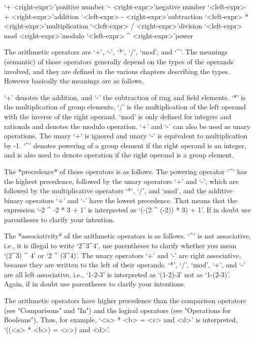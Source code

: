 

\>`+ <right-expr>'{positive number}
\>`- <right-expr>'{negative number}
\>`<left-expr> + <right-expr>'{addition}
\>`<left-expr> - <right-expr>'{subtraction}
\>`<left-expr> * <right-expr>'{multiplication}
\>`<left-expr> / <right-expr>'{division}
\>`<left-expr> mod <right-expr>'{modulo}
\>`<left-expr> ^ <right-expr>'{power}

The arithmetic operators are `+', `-', `*', `/', `mod', and `^'.
The meanings (semantic) of those operators generally depend on the types
of the operands involved, and they are defined in the various chapters
describing the types. However basically the meanings are as follows.

`+' denotes the addition, and `-' the subtraction of ring and field
elements.  `*' is the multiplication of group elements, `/' is the
multiplication of the left operand with the inverse of the right operand.
`mod' is only defined for integers and rationals and denotes the modulo
operation. `+' and `-' can also be used as unary operations. The unary
`+' is ignored and unary `-' is equivalent to multiplication by -1. `^'
denotes powering of a group element if the right operand is an integer,
and is also used to denote operation if the right operand is a group
element.

The *precedence* of those operators is as follows. The powering operator
`^' has the highest precedence, followed by the unary operators `+' and
`-', which are followed by the multiplicative operators `*', `/', and
`mod', and the additive binary operators `+' and `-' have the lowest
precedence.  That means that the expression `-2 ^ -2 * 3 + 1' is
interpreted as `(-(2 ^ (-2)) * 3) + 1'. If in doubt use parentheses
to clarify your intention.

The *associativity* of the arithmetic operators is as follows.
`^' is not associative, i.e., it is illegal to write `2^3^4',
use parentheses to clarify whether you mean `(2^3) ^ 4' or `2 ^ (3^4)'.
The unary
operators `+' and `-' are right associative, because they are written to
the left of their operands. `*', `/', `mod', `+', and `-' are all left
associative, i.e., `1-2-3' is interpreted as `(1-2)-3' not as `1-(2-3)'.
Again, if in doubt use parentheses to clarify your intentions.

The arithmetic operators have higher precedence than the comparison
operators (see "Comparisons" and "In") and the logical operators (see
"Operations for Booleans"). Thus, for example, `<a> * <b> = <c> and
<d>' is interpreted, `((<a> * <b>) = <c>) and <d>'.

